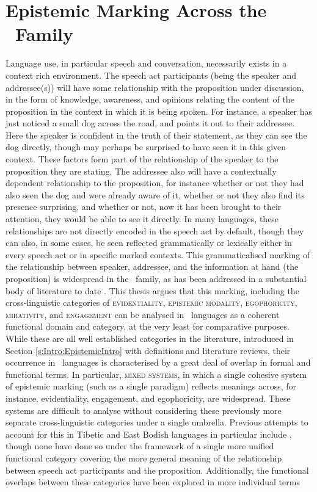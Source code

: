 \section{Epistemic Marking Across the \lfam\ Family}\label{s:Intro:Thesis}
Language use, in particular speech and conversation, necessarily exists in a context rich environment. The speech act participants (being the speaker and addressee(s)) will have some relationship with the proposition under discussion, in the form of knowledge, awareness, and opinions relating the content of the proposition in the context in which it is being spoken. For instance, a speaker has just noticed a small dog across the road, and points it out to their addressee. Here the speaker is confident in the truth of their statement, as they can see the dog directly, though may perhaps be surprised to have seen it in this given context. These factors form part of the relationship of the speaker to the proposition they are stating. The addressee also will have a contextually dependent relationship to the proposition, for instance whether or not they had also seen the dog and were already aware of it, whether or not they also find its presence surprising, and whether or not, now it has been brought to their attention, they would be able to see it directly. In many languages, these relationships are not directly encoded in the speech act by default, though they can also, in some cases, be seen reflected grammatically or lexically either in every speech act or in specific marked contexts. This grammaticalised marking of the relationship between speaker, addressee, and the information at hand (the proposition) is widespread in the \lfam\ family, as has been addressed in a substantial body of literature to date \cites{Aikhenvald2004}{Hill2017}. This thesis argues that this marking, including the cross-linguistic categories of \textsc{evidentiality}, \textsc{epistemic modality}, \textsc{egophoricity}, \textsc{mirativity}, and \textsc{engagement} can be analysed in \lfam\ languages as a coherent functional domain and category, at the very least for comparative purposes. While these are all well established categories in the literature, introduced in Section \ref{s:Intro:EpistemicIntro} with definitions and literature reviews, their occurrence in \lfam\ languages is characterised by a great deal of overlap in formal and functional terms. In particular, \textsc{mixed systems}, in which a single cohesive system of epistemic marking (such as a single paradigm) reflects meanings across, for instance, evidentiality, engagement, and egophoricity, are widespread. These systems are difficult to analyse without considering these previously more separate cross-linguistic categories under a single umbrella. Previous attempts to account for this in Tibetic and East Bodish languages in particular include , though none have done so under the framework of a single more unified functional category covering the more general meaning of the relationship between speech act participants and the proposition. Additionally, the functional overlaps between these categories have been explored in more individual terms 